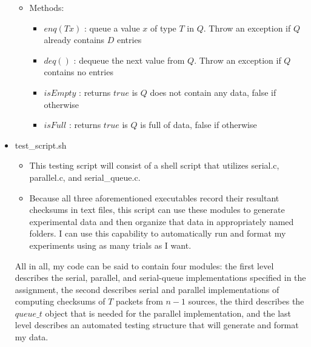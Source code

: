 \documentclass[]{article}
\begin{document}
\begin{itemize}
\begin{itemize}
\begin{itemize}
		\end{itemize}
		\item Methods:
		\begin{itemize}
			\item $enq(T x)$ : queue a value $x$ of type $T$ in $Q$. Throw an exception if $Q$ already contains $D$ entries
			\item $deq()$ : dequeue the next value from $Q$. Throw an exception if $Q$ contains no entries
			\item $isEmpty$ : returns $true$ is $Q$ does not contain any data, false if otherwise
			\item $isFull$ : returns $true$ is $Q$ is full of data, false if otherwise
		\end{itemize}
	\end{itemize}
	\item test\_script.sh
	\begin{itemize}
		\item This testing script will consist of a shell script that utilizes serial.c, parallel.c, and serial\_queue.c.
		\item Because all three aforementioned executables record their resultant checksums in text files, this script can use these modules to generate experimental data and then organize that data in appropriately named folders. I can use this capability to automatically run and format my experiments using as many trials as I want.
	\end{itemize}
All in all, my code can be said to contain four modules: the first level describes the serial, parallel, and serial-queue implementations specified in the assignment, the second describes serial and parallel implementations of computing checksums of $T$ packets from $n -1$ sources, the third describes the $queue\_t$ object that is needed for the parallel implementation, and the last level describes an automated testing structure that will generate and format my data.
\end{itemize}
\end{document}
